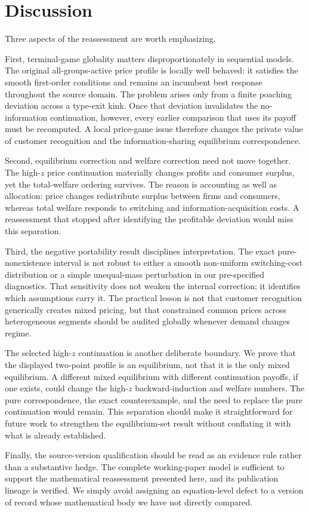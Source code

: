 \section{Discussion}\label{sec:discussion}

Three aspects of the reassessment are worth emphasizing.

First, terminal-game globality matters disproportionately in sequential models.  The original all-groups-active price profile is locally well behaved: it satisfies the smooth first-order conditions and remains an incumbent best response throughout the source domain.  The problem arises only from a finite poaching deviation across a type-exit kink.  Once that deviation invalidates the no-information continuation, however, every earlier comparison that uses its payoff must be recomputed.  A local price-game issue therefore changes the private value of customer recognition and the information-sharing equilibrium correspondence.

Second, equilibrium correction and welfare correction need not move together.  The high-\(z\) price continuation materially changes profits and consumer surplus, yet the total-welfare ordering survives.  The reason is accounting as well as allocation: price changes redistribute surplus between firms and consumers, whereas total welfare responds to switching and information-acquisition costs.  A reassessment that stopped after identifying the profitable deviation would miss this separation.

Third, the negative portability result disciplines interpretation.  The exact pure-nonexistence interval is not robust to either a smooth non-uniform switching-cost distribution or a simple unequal-mass perturbation in our pre-specified diagnostics.  That sensitivity does not weaken the internal correction; it identifies which assumptions carry it.  The practical lesson is not that customer recognition generically creates mixed pricing, but that constrained common prices across heterogeneous segments should be audited globally whenever demand changes regime.

The selected high-\(z\) continuation is another deliberate boundary.  We prove that the displayed two-point profile is an equilibrium, not that it is the only mixed equilibrium.  A different mixed equilibrium with different continuation payoffs, if one exists, could change the high-\(z\) backward-induction and welfare numbers.  The pure correspondence, the exact counterexample, and the need to replace the pure continuation would remain.  This separation should make it straightforward for future work to strengthen the equilibrium-set result without conflating it with what is already established.

Finally, the source-version qualification should be read as an evidence rule rather than a substantive hedge.  The complete working-paper model is sufficient to support the mathematical reassessment presented here, and its publication lineage is verified.  We simply avoid assigning an equation-level defect to a version of record whose mathematical body we have not directly compared.
